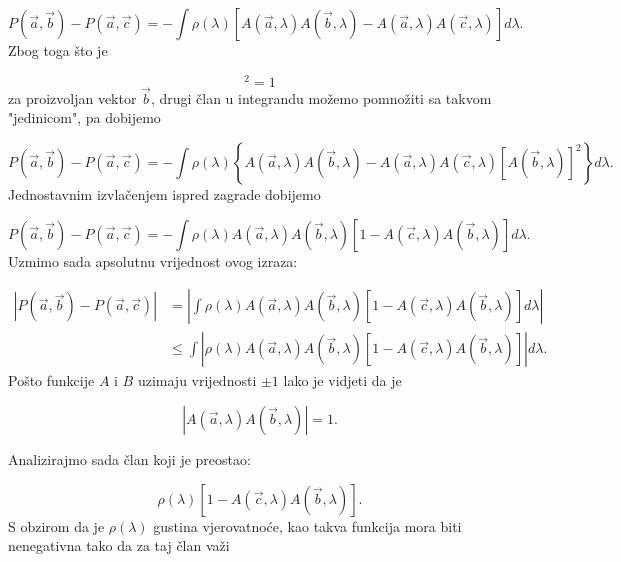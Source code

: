 \begin{equation}
    P(\vec{a}, \vec{b}) - P(\vec{a}, \vec{c})  = - \int \rho (\lambda) [A(\vec{a}, \lambda) A(\vec{b}, \lambda) - A(\vec{a}, \lambda) A(\vec{c}, \lambda) ] d\lambda.
\end{equation}
Zbog toga što je

\begin{equation}
    [A(\vec{b}, \lambda)]^2 = 1
\end{equation}
za proizvoljan vektor $\vec{b}$, drugi član u integrandu možemo pomnožiti sa takvom "jedinicom", pa dobijemo

\begin{equation}
    P(\vec{a}, \vec{b}) - P(\vec{a}, \vec{c})  = - \int \rho (\lambda) \left\{A(\vec{a}, \lambda) A(\vec{b}, \lambda) - A(\vec{a}, \lambda) A(\vec{c}, \lambda)[A(\vec{b}, \lambda)]^2 \right\}d\lambda.
\end{equation}
Jednostavnim izvlačenjem ispred zagrade dobijemo

\begin{equation}
    P(\vec{a}, \vec{b}) - P(\vec{a}, \vec{c})  = - \int \rho (\lambda) A(\vec{a}, \lambda) A(\vec{b}, \lambda) [1- A(\vec{c}, \lambda) A(\vec{b}, \lambda) ] d\lambda.
\end{equation}
Uzmimo sada apsolutnu vrijednost ovog izraza:

\begin{equation}
    \begin{aligned}
        \left|{P(\vec{a}, \vec{b}) - P(\vec{a}, \vec{c})}\right| & =  \left| \int  \rho (\lambda) A(\vec{a}, \lambda) A(\vec{b}, \lambda) [1- A(\vec{c}, \lambda) A(\vec{b}, \lambda)  ] d\lambda \right|\\[1ex]
         & \le  \int  \left| \rho (\lambda) A(\vec{a}, \lambda) A(\vec{b}, \lambda) [1- A(\vec{c}, \lambda) A(\vec{b}, \lambda)  ]\right| d\lambda .
    \end{aligned}
\end{equation}
Pošto funkcije $A$ i $B$ uzimaju vrijednosti $\pm 1$ lako je vidjeti da je

\begin{equation}
    \left|A(\vec{a}, \lambda) A(\vec{b}, \lambda)\right| = 1.
\end{equation}

Analizirajmo sada član koji je preostao:

\begin{equation}
    \rho (\lambda)[1 - A(\vec{c}, \lambda) A(\vec{b}, \lambda) ].
\end{equation}
S obzirom da je $\rho(\lambda)$ gustina vjerovatnoće, kao takva funkcija mora biti nenegativna tako da za taj član važi

